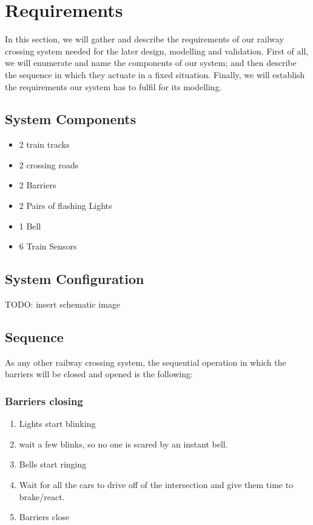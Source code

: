 \documentclass[final]{report}
\begin{document}
\chapter{Requirements}
In this section, we will gather and describe the requirements of our railway crossing system needed for the later design, modelling and validation. First of all, we will enumerate and name the components of our system; and then describe the sequence in which they actuate in a fixed situation. Finally, we will establish the requirements our system has to fulfil for its modelling. 

\section{System Components} %
\begin{itemize}
\item 2 train tracks
\item 2 crossing roads
\item 2 Barriers
\item 2 Pairs of flashing Lights
\item 1 Bell
\item 6 Train Sensors
\end{itemize}
\section{System Configuration}
TODO: insert schematic image
\section{Sequence}
As any other railway crossing system, the sequential operation in which the barriers will be closed and opened is the following:

\subsection{Barriers closing}
\begin{enumerate}
\item Lights start blinking
\item wait a few blinks, so no one is scared by an instant bell. %
\item Bells start ringing
\item Wait for all the cars to drive off of the intersection and give them time to brake/react.
\item Barriers close
\end{enumerate}
\end{document}
